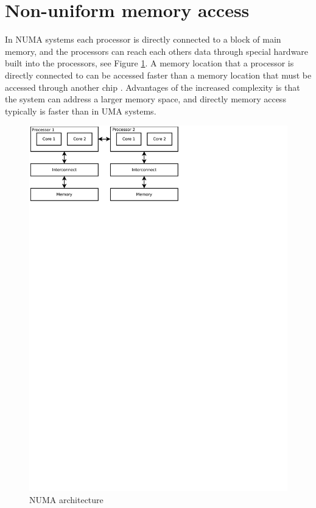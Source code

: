 \section{Non-uniform memory access}

In NUMA systems each processor is directly connected to a block of
main memory, and the processors can reach each others data through
special hardware built into the processors, see Figure
\ref{fig:numa-arch}. A memory location that a processor is directly
connected to can be accessed faster than a memory location that must
be accessed through another chip \cite{pacheco}. Advantages of the
increased complexity is that the system can address a larger memory
space, and directly memory access typically is faster than in UMA
systems.

\begin{figure}[H]
	\centering
	\includegraphics[scale=0.8,trim=0 23.55cm 8.8cm 0]{img/numa}
	\caption{NUMA architecture}
	\label{fig:numa-arch}
\end{figure}

